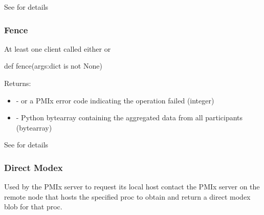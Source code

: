 See  for details


\subsubsection{Fence}

\summary

At least one client called either  or 

\format

\pyspecificstart
\begin{codepar}
def fence(args:dict is not None)
\end{codepar}
\pyspecificend

\begin{arglist}
\end{arglist}

Returns:
\begin{itemize}
    \item {} -  or a \ac{PMIx} error code indicating the operation failed (integer)
    \item {} - Python bytearray containing the aggregated data from all participants (bytearray)
\end{itemize}

See  for details


\subsubsection{Direct Modex}

\summary

Used by the PMIx server to request its local host contact the \ac{PMIx} server on the remote node that hosts the specified proc to obtain and return a direct modex blob for that proc.

